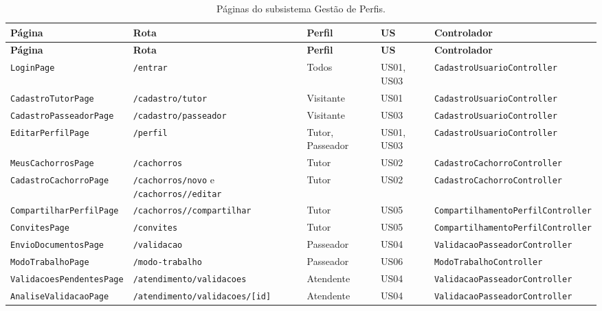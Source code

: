 \begin{scriptsize}
\setlength{\tabcolsep}{3pt}
\begin{longtable}{|p{4.2cm}|p{3.6cm}|p{1.7cm}|p{1.3cm}|p{3.8cm}|}
	\caption{Páginas do subsistema Gestão de Perfis.}
	\label{tabela-ciu-perfis}\\\hline
	\rowcolor{lightgray}
	\textbf{Página} & \textbf{Rota} & \textbf{Perfil} & \textbf{US} & \textbf{Controlador} \\\hline
	\endfirsthead
	\hline
	\rowcolor{lightgray}
	\textbf{Página} & \textbf{Rota} & \textbf{Perfil} & \textbf{US} & \textbf{Controlador} \\\hline
	\endhead
	\texttt{LoginPage} & \texttt{/entrar} & Todos & US01, US03 & \texttt{CadastroUsuario\-Controller} \\\hline
	\texttt{CadastroTutorPage} & \texttt{/cadastro/tutor} & Visitante & US01 & \texttt{CadastroUsuario\-Controller} \\\hline
	\texttt{CadastroPasseadorPage} & \texttt{/cadastro/\allowbreak passeador} & Visitante & US03 & \texttt{CadastroUsuario\-Controller} \\\hline
	\texttt{EditarPerfilPage} & \texttt{/perfil} & Tutor, Passeador & US01, US03 & \texttt{CadastroUsuario\-Controller} \\\hline
	\texttt{MeusCachorrosPage} & \texttt{/cachorros} & Tutor & US02 & \texttt{CadastroCachorro\-Controller} \\\hline
	\texttt{CadastroCachorroPage} & \texttt{/cachorros/novo} e \texttt{/cachorros/\allowbreak [id]/editar} & Tutor & US02 & \texttt{CadastroCachorro\-Controller} \\\hline
	\texttt{CompartilharPerfilPage} & \texttt{/cachorros/\allowbreak [id]/compartilhar} & Tutor & US05 & \texttt{Compartilhamento\-PerfilController} \\\hline
	\texttt{ConvitesPage} & \texttt{/convites} & Tutor & US05 & \texttt{Compartilhamento\-PerfilController} \\\hline
	\texttt{EnvioDocumentosPage} & \texttt{/validacao} & Passeador & US04 & \texttt{ValidacaoPasseador\-Controller} \\\hline
	\texttt{ModoTrabalhoPage} & \texttt{/modo-trabalho} & Passeador & US06 & \texttt{ModoTrabalho\-Controller} \\\hline
	\texttt{ValidacoesPendentesPage} & \texttt{/atendimento/\allowbreak validacoes} & Atendente & US04 & \texttt{ValidacaoPasseador\-Controller} \\\hline
	\texttt{AnaliseValidacaoPage} & \texttt{/atendimento/\allowbreak validacoes/[id]} & Atendente & US04 & \texttt{ValidacaoPasseador\-Controller} \\\hline
\end{longtable}
\end{scriptsize}

